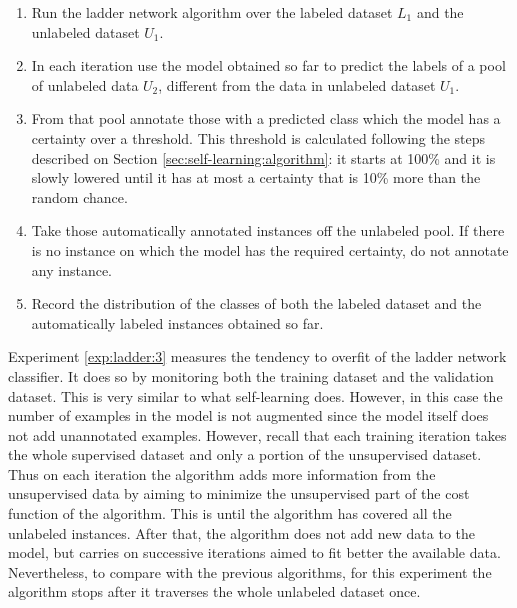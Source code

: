 \begin{experiment}\label{exp:ladder:2}
  \begin{enumerate}
    \item Run the ladder network algorithm over the labeled dataset $L_{1}$ and
      the unlabeled dataset $U_{1}$.
    \item In each iteration use the model obtained so far to predict the labels
      of a pool of unlabeled data $U_{2}$, different from the data in unlabeled
      dataset $U_{1}$.
    \item From that pool annotate those with a predicted class which the model
      has a certainty over a threshold. This threshold is calculated following
      the steps described on Section \ref{sec:self-learning:algorithm}: it
      starts at 100\% and it is slowly lowered until it has at most a certainty
      that is 10\% more than the random chance. 
    \item Take those automatically annotated instances off the unlabeled pool.
      If there is no instance on which the model has the required certainty, do
      not annotate any instance.
    \item Record the distribution of the classes of both the labeled dataset
      and the automatically labeled instances obtained so far.
  \end{enumerate}
\end{experiment}

Experiment \ref{exp:ladder:3} measures the tendency to overfit of the ladder
network classifier. It does so by monitoring both the training dataset and the
validation dataset. This is very similar to what self-learning does. However,
in this case the number of examples in the model is not augmented since the
model itself does not add unannotated examples. However, recall that each
training iteration takes the whole supervised dataset and only a portion of the
unsupervised dataset. Thus on each iteration the algorithm adds more
information from the unsupervised data by aiming to minimize the unsupervised
part of the cost function of the algorithm. This is until the algorithm has
covered all the unlabeled instances. After that, the algorithm does not add new
data to the model, but carries on successive iterations aimed to fit better the
available data. Nevertheless, to compare with the previous algorithms, for this
experiment the algorithm stops after it traverses the whole unlabeled dataset
once.


